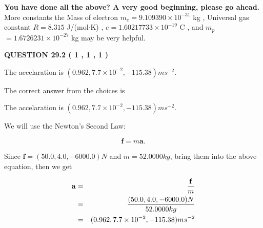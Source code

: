 \documentclass[12pt]{article}
\begin{document}
 
   
   
\vspace{0.3in}
{\textbf{\LARGE{You have done all the above? A very good beginning, please go ahead.}}}
More constants the
Mass of electron
$m_e$$ =
9.109390 \times 10^{-31} $
kg
,
Universal gas constant
$R$$ =
8.315 $
J/(mol$\cdot $K)
,
$e$$ =
1.60217733 \times 10^{-19} $
C
, and
$m_p$$ =
1.6726231 \times 10^{-27} $
kg
%
may be very helpful.
\vspace{0.3in}
   
   
  
\vspace{0.2in}
  
{\textbf{\Large{QUESTION
29.2 
 (           1 ,           1 ,           1 )
}}}
  
  


 
 
\noindent{}
 
 
The accelaration is $  %
(
0.962,
7.7 \times 10^{-2},
-115.38)
ms^{-2} $.
 
 
 
 
 
 
\noindent{}

The correct answer from the choices is


The accelaration is $  %
(
0.962,
7.7 \times 10^{-2},
-115.38)
ms^{-2} $.
 
 
 
 
 
\noindent{}

We will use the Newton's Second Law:
 
\[
\mathbf{f}=m\mathbf{a}.
\]
 
Since $\mathbf{f}= %
(50.0 , 4.0 , -6000.0) N$
and $m= %
52.0000kg$, bring them into the above equation, then we get
 
\begin{eqnarray*}
\mathbf{a}&=&\frac{\mathbf{f}}m  \\
&=&\frac{ %
(50.0 , 4.0 , -6000.0) N}{ %
52.0000kg}  \\
&=& %
(0.962 , 7.7 \times 10^{-2} , -115.38) ms^{-2}
\end{eqnarray*}
 
 
 
  
\vspace{0.2in}
  
\end{document}
